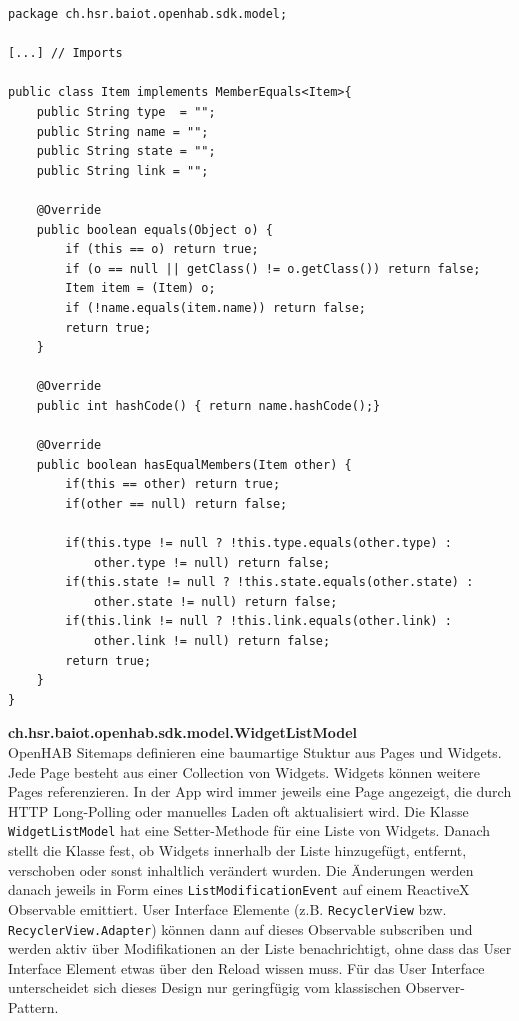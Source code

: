 \begin{lstlisting}[style=csharp, label=lst:modelSample, caption=Item.java - Beispiel einer Model-Klasse]
package ch.hsr.baiot.openhab.sdk.model;

[...] // Imports

public class Item implements MemberEquals<Item>{
	public String type  = "";
	public String name = "";
	public String state = "";
	public String link = "";

	@Override
	public boolean equals(Object o) {
		if (this == o) return true;
		if (o == null || getClass() != o.getClass()) return false;
		Item item = (Item) o;
		if (!name.equals(item.name)) return false;
		return true;
	}

	@Override
	public int hashCode() { return name.hashCode();}

	@Override
	public boolean hasEqualMembers(Item other) {
		if(this == other) return true;
		if(other == null) return false;

		if(this.type != null ? !this.type.equals(other.type) : 
			other.type != null) return false;
		if(this.state != null ? !this.state.equals(other.state) : 
			other.state != null) return false;
		if(this.link != null ? !this.link.equals(other.link) : 
			other.link != null) return false;
		return true;
	}
}
\end{lstlisting}

\textbf{ch.hsr.baiot.openhab.sdk.model.WidgetListModel}\\
OpenHAB Sitemaps definieren eine baumartige Stuktur aus Pages und Widgets. Jede Page besteht aus einer Collection von Widgets. Widgets können weitere Pages referenzieren. In der App wird immer jeweils eine Page angezeigt, die durch HTTP Long-Polling oder manuelles Laden oft aktualisiert wird. Die Klasse \lstinline!WidgetListModel! hat eine Setter-Methode für eine Liste von Widgets. Danach stellt die Klasse fest, ob Widgets innerhalb der Liste hinzugefügt, entfernt, verschoben oder sonst inhaltlich verändert wurden. Die Änderungen werden danach jeweils in Form eines \lstinline!ListModificationEvent! auf einem ReactiveX Observable emittiert. User Interface Elemente (z.B. \lstinline!RecyclerView! bzw. \lstinline!RecyclerView.Adapter!) können dann auf dieses Observable subscriben und werden aktiv über Modifikationen an der Liste benachrichtigt, ohne dass das User Interface Element etwas über den Reload wissen muss. Für das User Interface unterscheidet sich dieses Design nur geringfügig vom klassischen Observer-Pattern. 

